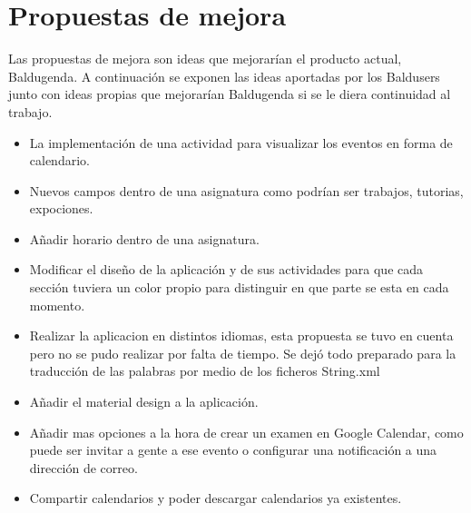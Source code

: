 \section{Propuestas de mejora}

Las propuestas de mejora son ideas que mejorarían el producto actual, Baldugenda.
A continuación se exponen las ideas aportadas por los Baldusers junto con ideas propias que mejorarían Baldugenda si se le diera continuidad al trabajo. 
\begin{itemize}
	\item La implementación de una actividad para visualizar los eventos en forma de calendario.
	\item Nuevos campos dentro de una asignatura como podrían ser trabajos, tutorias, expociones.
	\item Añadir horario dentro de una asignatura.
	\item Modificar el diseño de la aplicación y de sus actividades para que cada sección tuviera un color propio para distinguir en que parte se esta en cada momento.
	\item Realizar la aplicacion en distintos idiomas, esta propuesta se tuvo en cuenta pero no se pudo realizar por falta de tiempo. Se dejó todo preparado para la traducción de las palabras por medio de los ficheros String.xml
	\item Añadir el material design a la aplicación.
	\item Añadir mas opciones a la hora de crear un examen en Google Calendar, como puede ser invitar a gente a ese evento o configurar una notificación a una dirección de correo.
	\item Compartir calendarios y poder descargar calendarios ya existentes.
\end{itemize}